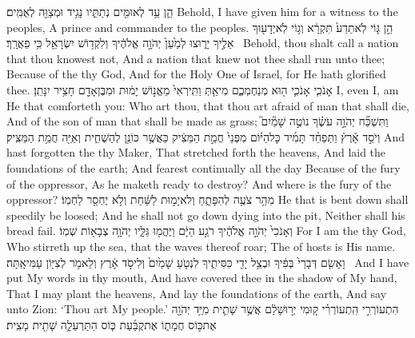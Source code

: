 {הֵ֛ן עֵ֥ד לְאוּמִּ֖ים נְתַתִּ֑יו נָגִ֥יד וּמְצַוֵּ֖ה לְאֻמִּֽים׃}
{Behold, I have given him for a witness to the peoples, A prince and commander to the peoples.}
{הֵ֣ן גּ֤וֹי לֹֽא\maqqaf תֵדַע֙ תִּקְרָ֔א וְג֥וֹי לֹֽא\maqqaf יְדָע֖וּךָ אֵלֶ֣יךָ יָר֑וּצוּ לְמַ֙עַן֙ יְהֹוָ֣ה אֱלֹהֶ֔יךָ וְלִקְד֥וֹשׁ יִשְׂרָאֵ֖ל כִּ֥י פֵאֲרָֽךְ׃ \setuma }
{Behold, thou shalt call a nation that thou knowest not, And a nation that knew not thee shall run unto thee; Because of the \lord\space thy God, And for the Holy One of Israel, for He hath glorified thee.}
\newperek
{}
\label{haft_48}
\setcounter{chap}{51}
\setcounter{verse}{12}
{אָנֹכִ֧י אָנֹכִ֛י ה֖וּא מְנַחֶמְכֶ֑ם מִי\maqqaf אַ֤תְּ וַתִּֽירְאִי֙ מֵאֱנ֣וֹשׁ יָמ֔וּת וּמִבֶּן\maqqaf אָדָ֖ם חָצִ֥יר יִנָּתֵֽן׃}
{I, even I, am He that comforteth you: Who art thou, that thou art afraid of man that shall die, And of the son of man that shall be made as grass;}
{וַתִּשְׁכַּ֞ח יְהֹוָ֣ה עֹשֶׂ֗ךָ נוֹטֶ֣ה שָׁמַ֘יִם֮ וְיֹסֵ֣ד אָ֒רֶץ֒ וַתְּפַחֵ֨ד תָּמִ֜יד כׇּל\maqqaf הַיּ֗וֹם מִפְּנֵי֙ חֲמַ֣ת הַמֵּצִ֔יק כַּאֲשֶׁ֥ר כּוֹנֵ֖ן לְהַשְׁחִ֑ית וְאַיֵּ֖ה חֲמַ֥ת הַמֵּצִֽיק׃}
{And hast forgotten the \lord\space thy Maker, That stretched forth the heavens, And laid the foundations of the earth; And fearest continually all the day Because of the fury of the oppressor, As he maketh ready to destroy? And where is the fury of the oppressor?}
{מִהַ֥ר צֹעֶ֖ה לְהִפָּתֵ֑חַ וְלֹא\maqqaf יָמ֣וּת לַשַּׁ֔חַת וְלֹ֥א יֶחְסַ֖ר לַחְמֽוֹ׃}
{He that is bent down shall speedily be loosed; And he shall not go down dying into the pit, Neither shall his bread fail.}
{וְאָנֹכִי֙ יְהֹוָ֣ה אֱלֹהֶ֔יךָ רֹגַ֣ע הַיָּ֔ם וַיֶּהֱמ֖וּ גַּלָּ֑יו יְהֹוָ֥ה צְבָא֖וֹת שְׁמֽוֹ׃}
{For I am the \lord\space thy God, Who stirreth up the sea, that the waves thereof roar; The \lord\space of hosts is His name.}
{וָאָשִׂ֤ם דְּבָרַי֙ בְּפִ֔יךָ וּבְצֵ֥ל יָדִ֖י כִּסִּיתִ֑יךָ לִנְטֹ֤עַ שָׁמַ֙יִם֙ וְלִיסֹ֣ד אָ֔רֶץ וְלֵאמֹ֥ר לְצִיּ֖וֹן עַמִּי\maqqaf אָֽתָּה׃ \setuma }
{And I have put My words in thy mouth, And have covered thee in the shadow of My hand, That I may plant the heavens, And lay the foundations of the earth, And say unto Zion: ‘Thou art My people.’}
{הִתְעוֹרְרִ֣י הִֽתְעוֹרְרִ֗י ק֚וּמִי יְר֣וּשָׁלַ֔͏ִם אֲשֶׁ֥ר שָׁתִ֛ית מִיַּ֥ד יְהֹוָ֖ה אֶת\maqqaf כּ֣וֹס חֲמָת֑וֹ אֶת\maqqaf קֻבַּ֜עַת כּ֧וֹס הַתַּרְעֵלָ֛ה שָׁתִ֖ית מָצִֽית׃}

